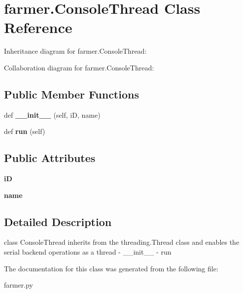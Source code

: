 \hypertarget{classfarmer_1_1ConsoleThread}{}\section{farmer.\+Console\+Thread Class Reference}
\label{classfarmer_1_1ConsoleThread}


Inheritance diagram for farmer.\+Console\+Thread\+:


Collaboration diagram for farmer.\+Console\+Thread\+:
\subsection*{Public Member Functions}
\begin{DoxyCompactItemize}
\item 
\mbox{\label{classfarmer_1_1ConsoleThread_abf3e3ac6f6c0c3a72748391a349d9bc5}} 
def {\bfseries \+\_\+\+\_\+init\+\_\+\+\_\+} (self, iD, name)
\item 
\mbox{\label{classfarmer_1_1ConsoleThread_a2bc2a3f2563038d0252b202a9861185d}} 
def {\bfseries run} (self)
\end{DoxyCompactItemize}
\subsection*{Public Attributes}
\begin{DoxyCompactItemize}
\item 
\mbox{\label{classfarmer_1_1ConsoleThread_ade1cf27c8cc5769ae9ed5bcd298ae334}} 
{\bfseries iD}
\item 
\mbox{\label{classfarmer_1_1ConsoleThread_a092667b23d2226591cb7be4719c5be21}} 
{\bfseries name}
\end{DoxyCompactItemize}


\subsection{Detailed Description}
\begin{DoxyVerb}class ConsoleThread inherits from the threading.Thread class and enables the serial backend operations as a thread
    - __init__
    - run
\end{DoxyVerb}
 

The documentation for this class was generated from the following file\+:\begin{DoxyCompactItemize}
\item 
farmer.\+py\end{DoxyCompactItemize}
